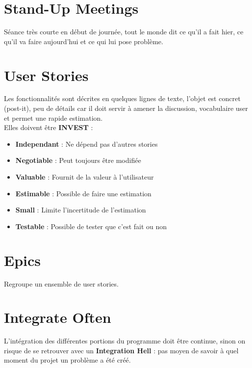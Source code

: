 \documentclass{report}
\begin{document}
	\section{Stand-Up Meetings}

		Séance très courte en début de journée, tout le monde dit ce qu'il a fait hier, ce qu'il va faire aujourd'hui et ce qui lui pose problème.\\


	\section{User Stories}

		Les fonctionnalités sont décrites en quelques lignes de texte, l'objet est concret (post-it), peu de détails car il doit servir à amener la discussion, vocabulaire user et permet une rapide estimation.\\

		Elles doivent être \textbf{INVEST} : \\

		\begin{itemize}
			\item \textbf{Independant} : Ne dépend pas d'autres stories
			\item \textbf{Negotiable} : Peut toujours être modifiée
			\item \textbf{Valuable} : Fournit de la valeur à l'utilisateur
			\item \textbf{Estimable} : Possible de faire une estimation
			\item \textbf{Small} : Limite l'incertitude de l'estimation
			\item \textbf{Testable} : Possible de tester que c'est fait ou non\\
		\end{itemize}

	\section{Epics}

		Regroupe un ensemble de user stories.\\

	\section{Integrate Often}

		L'intégration des différentes portions du programme doit être continue, sinon on risque de se retrouver avec un \textbf{Integration Hell} : pas moyen de savoir à quel moment du projet un problème a été créé.\\
\end{document}
